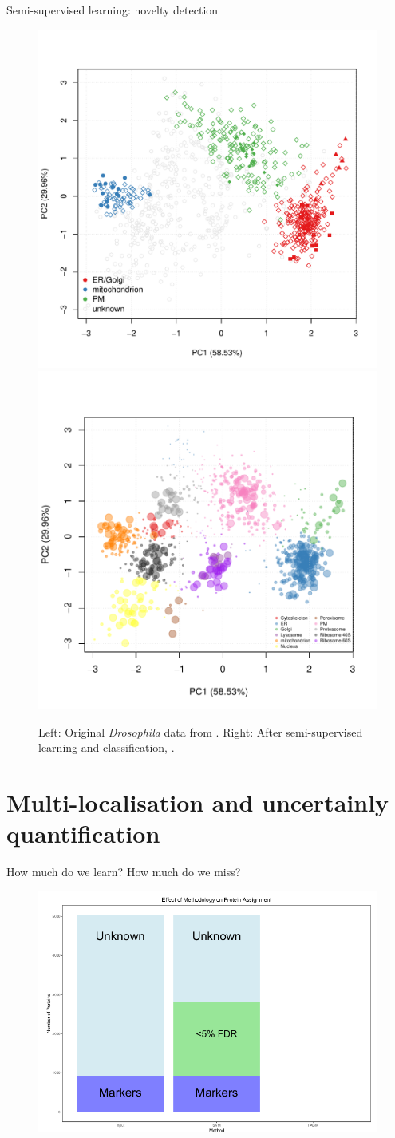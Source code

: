 \documentclass{beamer}
\theoremstyle{example}
\begin{document}
\begin{frame}{Semi-supervised learning: novelty detection}
  \begin{figure}
    \includegraphics[width=.48\linewidth]{figs/tan2009r1org.pdf}
    \includegraphics[width=.5\linewidth]{figs/pdres2fig.pdf}
    \caption{Left: Original \textit{Drosophila} data from
      \cite{Tan2009}. Right: After semi-supervised learning and
      classification, \cite{Breckels:2013}.}
  \end{figure}
\end{frame}



\section{Multi-localisation and uncertainly quantification}

\begin{frame}{How much do we learn? How much do we miss?}
  \begin{figure}
    \includegraphics[width=.8\linewidth]{./figs/preConcludePlot.png}
  \end{figure}
\end{frame}
\end{document}
